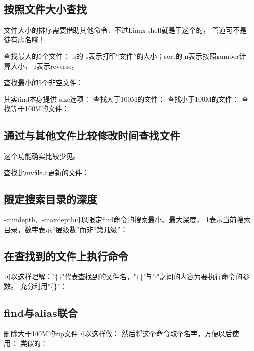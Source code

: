 ﻿\documentclass[a4paper,11pt]{article}
\begin{document}
  \subsection[按照文件大小查找]{按照文件大小查找}
  文件大小的排序需要借助其他命令，不过Linux shell就是干这个的，
  管道可不是徒有虚名哦！

  查找最大的5个文件：
  ls的-s表示打印“文件”的大小；sort的-n表示按照number计算大小，-r表示reverse。

  查找最小的5个非空文件：

  其实find本身提供-size选项：
  查找大于100M的文件：
  查找小于100M的文件：
  查找等于100M的文件：

  \subsection[通过与其他文件比较修改时间查找文件]{通过与其他文件比较修改时间查找文件}
  这个功能确实比较少见。

  查找比myfile.c更新的文件：


  \subsection[限定搜索目录的深度]{限定搜索目录的深度}
  -mindepth、-maxdepth可以限定find命令的搜索最小、最大深度，
  1表示当前搜索目录，数字表示“层级数”而非“第几级”：

  \subsection[在查找到的文件上执行命令]{在查找到的文件上执行命令}
  可以这样理解："\{\}"代表查找到的文件名，"\{\}"与"\bs;"之间的内容为要执行命令的参数。
  充分利用"\{\}"：

  \subsection[find与alias联合]{find与alias联合}
  删除大于100M的zip文件可以这样做：
  然后将这个命令取个名字，方便以后使用：
  类似的：
\end{document}
